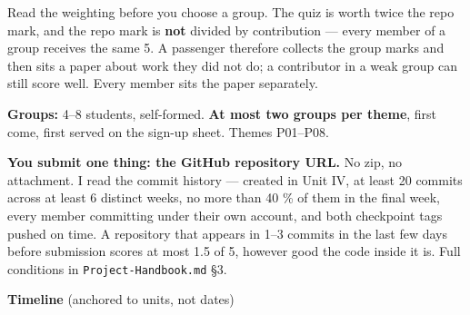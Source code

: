 \documentclass[11pt]{article}
\begin{document}
Read the weighting before you choose a group. The quiz is worth twice the repo mark, and the repo mark is \textbf{not} divided by contribution --- every member of a group receives the same 5. A passenger therefore collects the group marks and then sits a paper about work they did not do; a contributor in a weak group can still score well. Every member sits the paper separately.

\textbf{Groups:} 4--8 students, self-formed. \textbf{At most two groups per theme}, first come, first served on the sign-up sheet. Themes P01--P08.

\textbf{You submit one thing: the GitHub repository URL.} No zip, no attachment. I read the commit history --- created in Unit IV, at least 20 commits across at least 6 distinct weeks, no more than 40 \% of them in the final week, every member committing under their own account, and both checkpoint tags pushed on time. A repository that appears in 1--3 commits in the last few days before submission scores at most 1.5 of 5, however good the code inside it is. Full conditions in \texttt{Project-Handbook.md} §3.

\textbf{Timeline} (anchored to units, not dates)
\end{document}
